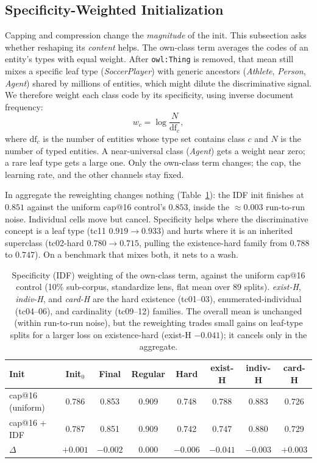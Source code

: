 \documentclass[a4paper,oneside,bibliography=totoc]{scrbook}
\begin{document}
\subsection{Specificity-Weighted Initialization}
\label{sec:dbpedia_specificity}

Capping and compression change the \emph{magnitude} of the init. This subsection
asks whether reshaping its \emph{content} helps. The own-class term averages the
codes of an entity's types with equal weight. After \texttt{owl:Thing} is
removed, that mean still mixes a specific leaf type (\textit{SoccerPlayer}) with
generic ancestors (\textit{Athlete}, \textit{Person}, \textit{Agent}) shared by
millions of entities, which might dilute the discriminative signal. We therefore
weight each class code by its specificity, using inverse document frequency:
\begin{equation*}
  w_c = \log\frac{N}{\mathrm{df}_c},
\end{equation*}
where $\mathrm{df}_c$ is the number of entities whose type set contains class $c$
and $N$ is the number of typed entities. A near-universal class (\textit{Agent})
gets a weight near zero; a rare leaf type gets a large one. Only the own-class
term changes; the cap, the learning rate, and the other channels stay fixed.

In aggregate the reweighting changes nothing (Table~\ref{tab:dbpedia_idf}): the
IDF init finishes at $0.851$ against the uniform cap@16 control's $0.853$, inside
the $\approx\!0.003$ run-to-run noise. Individual cells move but cancel.
Specificity helps where the discriminative concept is a leaf type (tc11 $0.919
\rightarrow 0.933$) and hurts where it is an inherited superclass (tc02-hard
$0.780 \rightarrow 0.715$, pulling the existence-hard family from $0.788$ to
$0.747$). On a benchmark that mixes both, it nets to a wash.

\begin{table}[t]
\centering
\small
\caption{Specificity (IDF) weighting of the own-class term, against the uniform
cap@16 control (10\% sub-corpus, standardize lens, flat mean over 89 splits).
\emph{exist-H}, \emph{indiv-H}, and \emph{card-H} are the hard existence
(tc01--03), enumerated-individual (tc04--06), and cardinality (tc09--12)
families. The overall mean is unchanged (within run-to-run noise), but the
reweighting trades small gains on leaf-type splits for a larger loss on
existence-hard (exist-H $-0.041$); it cancels only in the aggregate.}
\label{tab:dbpedia_idf}
\setlength{\tabcolsep}{5pt}
\begin{tabular}{lccccccc}
\toprule
\textbf{Init} & \textbf{Init$_0$} & \textbf{Final} & \textbf{Regular} & \textbf{Hard}
& \textbf{exist-H} & \textbf{indiv-H} & \textbf{card-H} \\
\midrule
cap@16 (uniform) & 0.786 & 0.853 & 0.909 & 0.748 & 0.788 & 0.883 & 0.726 \\
cap@16 + IDF     & 0.787 & 0.851 & 0.909 & 0.742 & 0.747 & 0.880 & 0.729 \\
\midrule
$\Delta$         & $+0.001$ & $-0.002$ & $0.000$ & $-0.006$ & $-0.041$ & $-0.003$ & $+0.003$ \\
\bottomrule
\end{tabular}
\end{table}
\end{document}
